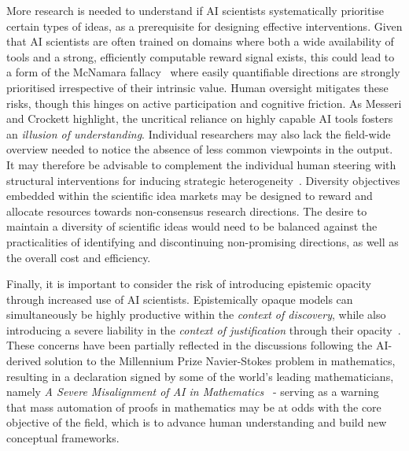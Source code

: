 \documentclass[11pt, a4paper, twocolumn, goog]{google}
\begin{document}
More research is needed to understand if AI scientists systematically prioritise certain types of ideas, as a prerequisite for designing effective interventions. Given that AI scientists are often trained on domains where both a wide availability of tools and a strong, efficiently computable reward signal exists, this could lead to a form of the McNamara fallacy~\citep{jannach2020escaping, bisht2026agenticaiscientistsbuilt} where easily quantifiable directions are strongly prioritised irrespective of their intrinsic value. Human oversight mitigates these risks, though this hinges on active participation and cognitive friction. As Messeri and Crockett \citep{messeri2024artificial} highlight, the uncritical reliance on highly capable AI tools fosters an \emph{illusion of understanding}. Individual researchers may also lack the field-wide overview needed to notice the absence of less common viewpoints in the output. It may therefore be advisable to complement the individual human steering with structural interventions for inducing strategic heterogeneity~\citep{repec:arx:papers:2604.09502}. Diversity objectives embedded within the scientific idea markets may be designed to reward and allocate resources towards non-consensus research directions. The desire to maintain a diversity of scientific ideas would need to be balanced against the practicalities of identifying and discontinuing non-promising directions, as well as the overall cost and efficiency.

Finally, it is important to consider the risk of introducing epistemic opacity~\citep{creel2020transparency, humphreys2004extending} through increased use of AI scientists. Epistemically opaque models can simultaneously be highly productive within the \textit{context of discovery}, while also introducing a severe liability in the \textit{context of justification} through their opacity~\citep{Duede_2023}. These concerns have been partially reflected in the discussions following the AI-derived solution to the Millennium Prize Navier-Stokes problem in mathematics, resulting in a declaration signed by some of the world's leading mathematicians, namely \emph{A Severe Misalignment of AI in Mathematics}~\citep{avila_2026_22737751} - serving as a warning that mass automation of proofs in mathematics may be at odds with the core objective of the field, which is to advance human understanding and build new conceptual frameworks.
\end{document}
